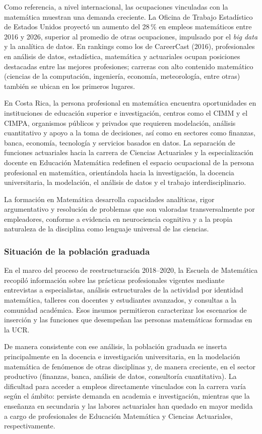 Como referencia, a nivel internacional, las ocupaciones vinculadas con la matemática muestran una demanda creciente. La Oficina de Trabajo Estadístico de Estados Unidos proyectó un aumento del 28\,\% en empleos matemáticos entre 2016 y 2026, superior al promedio de otras ocupaciones, impulsado por el \emph{big data} y la analítica de datos. En rankings como los de CareerCast (2016), profesionales en análisis de datos, estadística, matemática y actuariales ocupan posiciones destacadas entre las mejores profesiones; carreras con alto contenido matemático (ciencias de la computación, ingeniería, economía, meteorología, entre otras) también se ubican en los primeros lugares.

En Costa Rica, la persona profesional en matemática encuentra oportunidades en instituciones de educación superior e investigación, centros como el CIMM y el CIMPA, organismos públicos y privados que requieren modelación, análisis cuantitativo y apoyo a la toma de decisiones, así como en sectores como finanzas, banca, economía, tecnología y servicios basados en datos. La separación de funciones actuariales hacia la carrera de Ciencias Actuariales y la especialización docente en Educación Matemática redefinen el espacio ocupacional de la persona profesional en matemática, orientándola hacia la investigación, la docencia universitaria, la modelación, el análisis de datos y el trabajo interdisciplinario.

La formación en Matemática desarrolla capacidades analíticas, rigor argumentativo y resolución de problemas que son valoradas transversalmente por empleadores, conforme a evidencia en neurociencia cognitiva y a la propia naturaleza de la disciplina como lenguaje universal de las ciencias.


\subsubsection{Situación de la población graduada}

En el marco del proceso de reestructuración 2018--2020, la Escuela de Matemática recopiló información sobre las prácticas profesionales vigentes mediante entrevistas a especialistas, análisis estructurales de la actividad por identidad matemática, talleres con docentes y estudiantes avanzados, y consultas a la comunidad académica. Esos insumos permitieron caracterizar los escenarios de inserción y las funciones que desempeñan las personas matemáticas formadas en la UCR.

De manera consistente con ese análisis, la población graduada se inserta principalmente en la docencia e investigación universitaria, en la modelación matemática de fenómenos de otras disciplinas y, de manera creciente, en el sector productivo (finanzas, banca, análisis de datos, consultoría cuantitativa). La dificultad para acceder a empleos directamente vinculados con la carrera varía según el ámbito: persiste demanda en academia e investigación, mientras que la enseñanza en secundaria y las labores actuariales han quedado en mayor medida a cargo de profesionales de Educación Matemática y Ciencias Actuariales, respectivamente.

